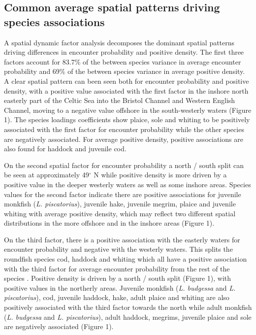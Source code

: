 \documentclass{nature}
\begin{document}
\begin{linenumbers}
\subsection{Common average spatial patterns driving species associations} A
spatial dynamic factor analysis decomposes the dominant spatial patterns
driving differences in encounter probability and positive density. The first
three factors  account for 83.7\% of the between
species variance in average encounter probability and 69\% of the
between species variance in average positive density. A clear spatial
pattern can been seen both for encounter probability and positive density, with
a positive value associated with the first factor in the inshore north easterly
part of the Celtic Sea into the Bristol Channel and Western English Channel,
moving to a negative value offshore in the south-westerly waters (Figure 1).
The species loadings coefficients show plaice, sole and whiting to be
positively associated with the first factor for encounter probability while the
other species are negatively associated. For average positive density,
positive associations are also found for haddock and juvenile cod.  

On the second spatial factor for encounter probability a north / south split
can be seen at approximately 49$^{\circ}$ N while positive density is more
driven by a positive value in the deeper westerly waters as well as some
inshore areas. Species values for the second factor indicate there are
positive associations for juvenile monkfish (\emph{L. piscatorius}), juvenile
hake, juvenile megrim, plaice and juvenile whiting with average positive
density, which may reflect two different spatial distributions in the more
offshore and in the inshore areas (Figure 1).

On the third factor, there is a positive association with the easterly waters
for encounter probability and negative with the westerly waters. This
 splits the
roundfish species cod, haddock and whiting which all have a positive
association with the third factor for average encounter probability from the
rest of the species .
Positive density is driven by a north / south split (Figure 1), with positive
values in the northerly areas. Juvenile monkfish (\emph{L.  budgessa} and
\emph{L. piscatorius}), cod, juvenile haddock, hake, adult plaice and whiting
are also positively associated with the third factor towards the north while
adult monkfish (\emph{L. budgessa} and \emph{L.  piscatorius}), adult haddock,
megrims, juvenile plaice and sole are negatively associated  (Figure 1).


\end{linenumbers}
\end{document}

